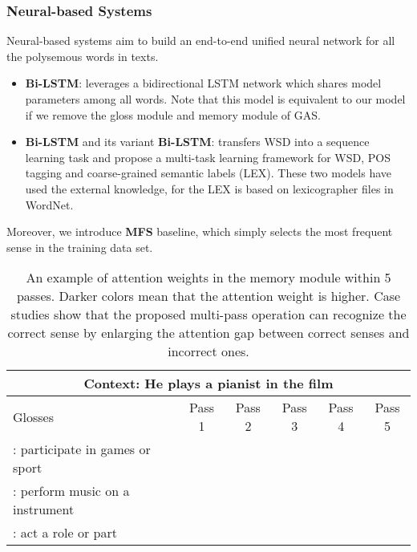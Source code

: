 \documentclass[11pt,a4paper]{article}
\begin{document}
\subsubsection{Neural-based Systems}
Neural-based systems aim to build an end-to-end unified neural network for all the polysemous words in texts.
\begin{itemize}
\item \textbf{Bi-LSTM}: \citet{bilstm} leverages a bidirectional LSTM network which shares model parameters among all words.
Note that this model is equivalent to our model if we remove the gloss module and memory module of GAS.
  \item \textbf{Bi-LSTM}  and its variant
  \textbf{Bi-LSTM}: \citet{Raganato2017} transfers WSD into a sequence learning task and propose a multi-task learning framework for WSD, POS tagging and coarse-grained semantic labels (LEX). These two models have used the external knowledge, for the LEX is based on lexicographer files in WordNet.
\end{itemize}

Moreover, we introduce \textbf{MFS} baseline, which simply selects the most frequent sense in the training data set.

\begin{table*}
\centering
    \begin{tabular}{|l|c|c|c|c|c|}
      \hline
\multicolumn{6}{|c|}{Context: He \textbf{plays} a pianist in the film} \\\hline
      Glosses & Pass 1 & Pass 2 & Pass 3 & Pass 4 & Pass 5 \\\hline

      : participate in games or sport & \cellcolor{blue1}&  &  &  &  \\ \hline
      : perform music on a instrument &  \cellcolor{blue3} & \cellcolor{blue2} & \cellcolor{blue1} & \cellcolor{blue1} & \cellcolor{blue1} \\ \hline
      : act a role or part &  \cellcolor{blue3} & \cellcolor{blue6} & \cellcolor{blue8} & \cellcolor{blue8} & \cellcolor{blue8} \\ \hline




\end{tabular}
   \caption{An example of attention weights in the memory module within 5 passes. Darker colors mean that the attention weight is higher.
Case studies show that the proposed multi-pass operation can recognize the correct sense by enlarging the attention gap between correct senses and incorrect ones.
   }\label{table:multipass-example}
\end{table*}
\end{document}
